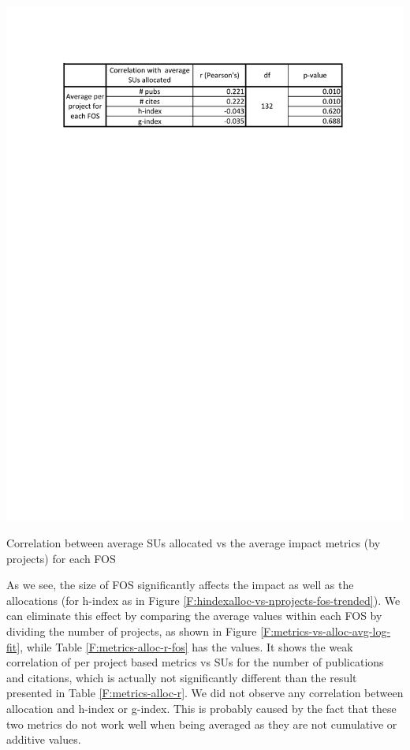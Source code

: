 \documentclass{sig-alternate}
\begin{document}
\begin{table}[!htb] 
  \centering 
    \includegraphics[width=1.0\columnwidth]{images/metrics_alloc_r_fos.pdf} 
  \caption{Correlation between average SUs allocated vs the average impact metrics (by projects) for each FOS}\label{F:metrics-alloc-r-fos} 
\end{table} 
 
As we see, the size of FOS significantly affects the impact as well as
the allocations (for h-index as in Figure
\ref{F:hindexalloc-vs-nprojects-fos-trended}). We can eliminate this
effect by comparing the average values within each FOS by dividing the
number of projects, as shown in Figure
\ref{F:metrics-vs-alloc-avg-log-fit}, while Table
\ref{F:metrics-alloc-r-fos} has the values. It shows the weak
correlation of per project based metrics vs SUs for the number of
publications and citations, which is actually not significantly
different than the result presented in Table \ref{F:metrics-alloc-r}. We
did not observe any correlation between allocation and h-index or
g-index. This is probably caused by the fact that these two metrics do
not work well when being averaged as they are not cumulative or
additive values.
 
\end{document}
